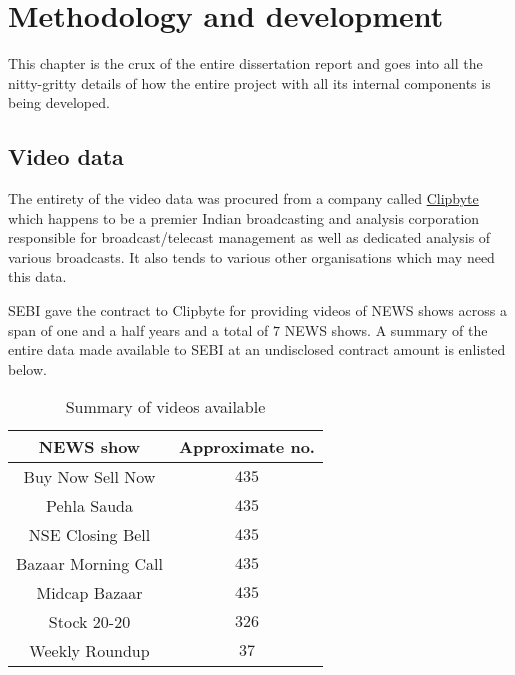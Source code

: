 \chapter{Methodology and development} \label{chapter3}

This chapter is the crux of the entire dissertation report and goes into all the nitty-gritty details of how the entire project with all its internal components is being developed.

\vspace{-0.1in}
\section{Video data} \label{vid_data}

The entirety of the video data was procured from a company called \href{clipbyte.com}{Clipbyte} which happens to be a premier Indian broadcasting and analysis corporation responsible for broadcast/telecast management as well as dedicated analysis of various broadcasts. It also tends to various other organisations which may need this data. \par

SEBI gave the contract to Clipbyte for providing videos of NEWS shows across a span of one and a half years and a total of $7$ NEWS shows. A summary of the entire data made available to SEBI at an undisclosed contract amount is enlisted below.

\begin{table}[h]
  \def\arraystretch{1.5}
  \centering
  \caption{Summary of videos available}
  \begin{tabular}{|c|c|}
    \hline
    NEWS show           & Approximate no. \\
    \hline
    Buy Now Sell Now    & $435$           \\
    \hline
    Pehla Sauda         & $435$           \\
    \hline
    NSE Closing Bell    & $435$           \\
    \hline
    Bazaar Morning Call & $435$           \\
    \hline
    Midcap Bazaar       & $435$           \\
    \hline
    Stock 20-20         & $326$           \\
    \hline
    Weekly Roundup      & $37$            \\
    \hline
  \end{tabular}
  \label{tab:news_shows_acquired}
\end{table}

